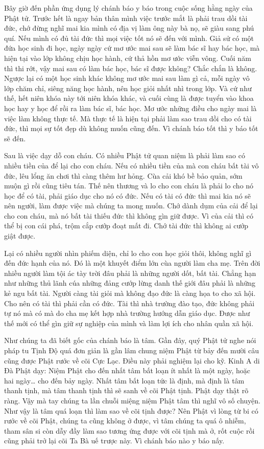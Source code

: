 \documentclass[
  12pt,
  oneside]{book}
\begin{document}
Bây giờ đến phần ứng dụng lý chánh báo y báo trong cuộc sống hằng ngày của Phật tử. Trước hết là ngay bản thân mình việc trước mắt là phải trau dồi tài đức, chớ đừng nghĩ mai kia mình có địa vị làm ông này bà nọ, sẽ giàu sang phú quí. Nếu mình có đủ tài đức thì mọi việc tốt nó sẽ đến với mình. Giả sử có một đứa học sinh đi học, ngày ngày cứ mơ ước mai sau sẽ làm bác sĩ hay bác học, mà hiện tại vào lớp không chịu học hành, cứ thả hồn mơ ước viễn vông. Cuối năm thì thi rớt, vậy mai sau có làm bác học, bác sĩ được không? Chắc chắn là không. Ngược lại có một học sinh khác không mơ ước mai sau làm gì cả, mỗi ngày vô lớp chăm chỉ, siêng năng học hành, nên học giỏi nhất nhì trong lớp. Và cứ như thế, hết niên khóa này tới niên khóa khác, và cuối cùng là được tuyển vào khoa học hay y học để rồi ra làm bác sĩ, bác học. Mơ ước những điều cho ngày mai là việc làm không thực tế. Mà thực tế là hiện tại phải làm sao trau dồi cho có tài đức, thì mọi sự tốt đẹp dù không muốn cũng đến. Vì chánh báo tốt thì y báo tốt sẽ đến.

Sau là việc dạy dỗ con cháu. Có nhiều Phật tử quan niệm là phải làm sao có nhiều tiền của để lại cho con cháu. Nếu có nhiều tiền của mà con cháu bất tài vô đức, lêu lổng ăn chơi thì càng thêm hư hỏng. Cùa cải khó bề bảo quản, sớm muộn gì rồi cũng tiêu tán. Thế nên thương và lo cho con cháu là phải lo cho nó học để có tài, phải giáo dục cho nó có đức. Nếu có tài có đức thì mai kia nó sẽ nên người, làm được việc mà chúng ta mong muốn. Chớ dành dụm của cải để lại cho con cháu, mà nó bất tài thiếu đức thì không gìn giữ được. Vì của cải thì có thể bị con cái phá, trộm cắp cướp đoạt mất đi. Chớ tài đức thì không ai cướp giật được.

Lại có nhiều người nhìn phiếm diện, chỉ lo cho con học giỏi thôi, không nghĩ gì đến đức hạnh của nó. Đó là một khuyết điểm lớn cùa người làm cha mẹ. Trên đời nhiều người làm tội ác tày trời đâu phải là những người dốt, bất tài. Chẳng hạn như những thủ lãnh cúa những đảng cướp lừng danh thế giới đâu phải là những kẻ ngu bất tài. Người càng tài giỏi mà không đạo đức là càng họa to cho xã hội. Cho nên có tài thì phải cần có đức. Tài thì nhà trường đào tạo, đức không phải tự nó mà có mà do cha mẹ kết hợp nhà trường hướng dẫn giáo dục. Được như thế mới có thể gìn giữ sự nghiệp của mình và làm lợi ích cho nhân quần xã hội.

Như chúng ta đã biết gốc của chánh báo là tâm. Gần đây, quý Phật tử nghe nói pháp tu Tịnh Độ quá đơn giản là gần lâm chung niệm Phật từ bảy đến mười câu cũng được Phật rước về cõi Cực Lạc. Điều này phải nghiệm lại cho kỹ. Kinh A di Đà Phật dạy: Niệm Phật cho đến nhất tâm bất loạn ít nhất là một ngày, hoặc hai ngày\ldots{} cho đến bảy ngày. Nhất tâm bất loạn tức là định, mà định là tâm thanh tịnh, mà tâm thanh tịnh thì sẽ sanh về cõi Phật tịnh. Phật dạy thật rõ ràng. Vậy mà tay chúng ta lần chuỗi miệng niệm Phật tâm thì nghĩ vô số chuyện. Như vậy là tâm quá loạn thì làm sao về cõi tịnh được? Nên Phật vì lòng từ bi có rước về cõi Phật, chúng ta cũng không ở được, vì tâm chúng ta quá ô nhiễm, tham sân si còn dẫy đầy làm sao tương ứng được với cõi tịnh mà ở, rốt cuộc rồi cũng phải trở lại cõi Ta Bà uế trược này. Vì chánh báo nào y báo nấy.
\end{document}
